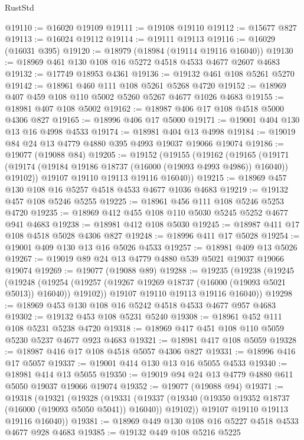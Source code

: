 \begin{lexlean}{RustStd}
\begin{coremodule}
{\begin{coremodule}
{{{{{{{{{{{{{{{{{{{{{{{{{{{{{{{{{{{{{{{{{{{{{{{{{{{{{{{{{{{{@19110 := @16020 @19109
@19111 := @19108 @19110
@19112 := @15677 @827
@19113 := @16024 @19112
@19114 := @19111 @19113
@19116 := @16029 (@16031 @395)
@19120 := @18979 (@18984 (@19114 @19116 @16040))
@19130 := @18969 @461 @130 @108 @16 @5272 @4518 @4533 @4677 @2607 @4683
@19132 := @17749 @18953 @4361
@19136 := @19132 @461 @108 @5261 @5270
@19142 := @18961 @460 @111 @108 @5261 @5268 @4720
@19152 := @18969 @407 @459 @108 @110 @5002 @5260 @5267 @4677 @1026 @4683
@19155 := @18981 @407 @108 @5002
@19162 := @18987 @406 @17 @108 @4518 @5000 @4306 @827
@19165 := @18996 @406 @17 @5000
@19171 := @19001 @404 @130 @13 @16 @4998 @4533
@19174 := @18981 @404 @13 @4998
@19184 := @19019 @84 @24 @13 @4779 @4880 @395 @4993 @19037 @19066 @19074
@19186 := @19077 (@19088 @84)
@19205 := @19152
    (@19155
      (@19162
        (@19165
          (@19171 (@19174 (@19184 @19186 @18737 (@16000 (@19093 @4993 @4986)) @16040)) @19102))
        @19107
        @19110
        @19113
        @19116
        @16040))
@19215 := @18969 @457 @130 @108 @16 @5257 @4518 @4533 @4677 @1036 @4683
@19219 := @19132 @457 @108 @5246 @5255
@19225 := @18961 @456 @111 @108 @5246 @5253 @4720
@19235 := @18969 @412 @455 @108 @110 @5030 @5245 @5252 @4677 @941 @4683
@19238 := @18981 @412 @108 @5030
@19245 := @18987 @411 @17 @108 @4518 @5028 @4306 @827
@19248 := @18996 @411 @17 @5028
@19254 := @19001 @409 @130 @13 @16 @5026 @4533
@19257 := @18981 @409 @13 @5026
@19267 := @19019 @89 @24 @13 @4779 @4880 @539 @5021 @19037 @19066 @19074
@19269 := @19077 (@19088 @89)
@19288 := @19235
    (@19238
      (@19245
        (@19248
          (@19254 (@19257 (@19267 @19269 @18737 (@16000 (@19093 @5021 @5013)) @16040)) @19102))
        @19107
        @19110
        @19113
        @19116
        @16040))
@19298 := @18969 @453 @130 @108 @16 @5242 @4518 @4533 @4677 @957 @4683
@19302 := @19132 @453 @108 @5231 @5240
@19308 := @18961 @452 @111 @108 @5231 @5238 @4720
@19318 := @18969 @417 @451 @108 @110 @5059 @5230 @5237 @4677 @923 @4683
@19321 := @18981 @417 @108 @5059
@19328 := @18987 @416 @17 @108 @4518 @5057 @4306 @827
@19331 := @18996 @416 @17 @5057
@19337 := @19001 @414 @130 @13 @16 @5055 @4533
@19340 := @18981 @414 @13 @5055
@19350 := @19019 @94 @24 @13 @4779 @4880 @611 @5050 @19037 @19066 @19074
@19352 := @19077 (@19088 @94)
@19371 := @19318
    (@19321
      (@19328
        (@19331
          (@19337 (@19340 (@19350 @19352 @18737 (@16000 (@19093 @5050 @5041)) @16040)) @19102))
        @19107
        @19110
        @19113
        @19116
        @16040))
@19381 := @18969 @449 @130 @108 @16 @5227 @4518 @4533 @4677 @928 @4683
@19385 := @19132 @449 @108 @5216 @5225
}}}}}}}}}}}}}}}}}}}}}}}}}}}}}}}}}}}}}}}}}}}}}}}}}}}}}}}}}}}}
\end{coremodule}}
\end{coremodule}
\end{lexlean}
